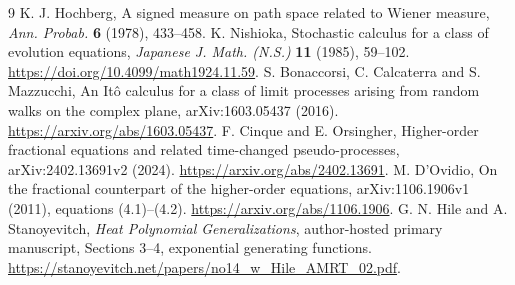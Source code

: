 \documentclass[11pt]{article}
\theoremstyle{remark}\newtheorem{remark}[theorem]{Remark}
\begin{document}
\begin{thebibliography}{9}
 K. J. Hochberg,
A signed measure on path space related to Wiener measure,
\emph{Ann. Probab.} \textbf{6} (1978), 433--458.
 K. Nishioka,
Stochastic calculus for a class of evolution equations,
\emph{Japanese J. Math. (N.S.)} \textbf{11} (1985), 59--102.
\url{https://doi.org/10.4099/math1924.11.59}.
 S. Bonaccorsi, C. Calcaterra and S. Mazzucchi,
An It\^o calculus for a class of limit processes arising from random
walks on the complex plane, arXiv:1603.05437 (2016).
\url{https://arxiv.org/abs/1603.05437}.
 F. Cinque and E. Orsingher,
Higher-order fractional equations and related time-changed
pseudo-processes, arXiv:2402.13691v2 (2024).
\url{https://arxiv.org/abs/2402.13691}.
 M. D'Ovidio,
On the fractional counterpart of the higher-order equations,
arXiv:1106.1906v1 (2011), equations (4.1)--(4.2).
\url{https://arxiv.org/abs/1106.1906}.
 G. N. Hile and A. Stanoyevitch,
\emph{Heat Polynomial Generalizations}, author-hosted primary manuscript,
Sections 3--4, exponential generating functions.
\url{https://stanoyevitch.net/papers/no14_w_Hile_AMRT_02.pdf}.
\end{thebibliography}
\end{document}
